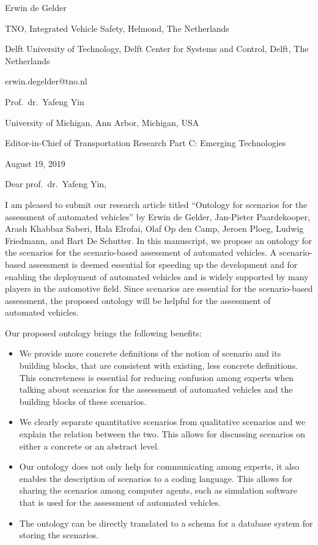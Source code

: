 \documentclass{article}
\begin{document}
Erwin de Gelder

TNO, Integrated Vehicle Safety, Helmond, The Netherlands

Delft University of Technology, Delft Center for Systems and Control, Delft, The Netherlands

erwin.degelder@tno.nl

\vspace{1em}

Prof.\ dr.\ Yafeng Yin

University of Michigan, Ann Arbor, Michigan, USA

Editor-in-Chief of Transportation Research Part C: Emerging Technologies

\vspace{1em}

August 19, 2019

\vspace{2em}


Dear prof.\ dr.\ Yafeng Yin,

\vspace{1em}

I am pleased to submit our research article titled “Ontology for scenarios for the assessment of automated vehicles” by Erwin de Gelder, Jan-Pieter Paardekooper, Arash Khabbaz Saberi, Hala Elrofai, Olaf Op den Camp, Jeroen Ploeg, Ludwig Friedmann, and Bart De Schutter. In this manuscript, we propose an ontology for the scenarios for the scenario-based assessment of automated vehicles. A scenario-based assessment is deemed essential for speeding up the development and for enabling the deployment of automated vehicles and is widely supported by many players in the automotive field. Since scenarios are essential for the scenario-based assessment, the proposed ontology will be helpful for the assessment of automated vehicles.

Our proposed ontology brings the following benefits:
\begin{itemize}
	\item We provide more concrete definitions of the notion of scenario and its building blocks, that are consistent with existing, less concrete definitions. This concreteness is essential for reducing confusion among experts when talking about scenarios for the assessment of automated vehicles and the building blocks of these scenarios.
	\item We clearly separate quantitative scenarios from qualitative scenarios and we explain the relation between the two. This allows for discussing scenarios on either a concrete or an abstract level.
	\item Our ontology does not only help for communicating among experts, it also enables the description of scenarios to a coding language. This allows for sharing the scenarios among computer agents, such as simulation software that is used for the assessment of automated vehicles.
	\item The ontology can be directly translated to a schema for a database system for storing the scenarios.
\end{itemize}
\end{document}
